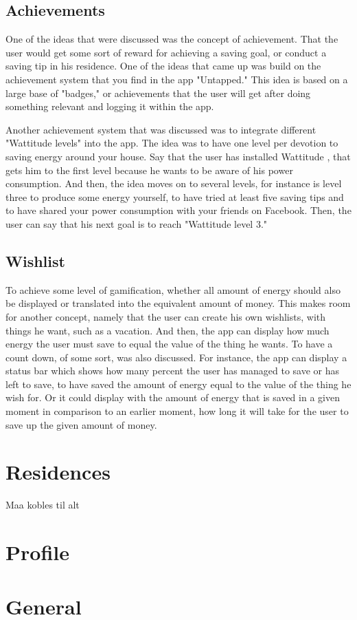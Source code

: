 \subsection{Achievements}
One of the ideas that were discussed was the concept of achievement. That the user would get some sort of reward for achieving a saving goal, or conduct a saving tip in his residence. One of the ideas that came up was build on the achievement system that you find in the app "Untapped." 
This idea is based on a large base of "badges," or achievements that the user will get after doing something relevant and logging it within the app. 

Another achievement system that was discussed was to integrate different "Wattitude levels" into the app. The idea was to have one level per devotion to saving energy around your house. Say that the user has installed Wattitude , that gets him to the first level because he wants to be aware of his power consumption. And then, the idea moves on to several levels, for instance is level three to produce some energy yourself, to have tried at least five saving tips and to have shared your power consumption with your friends on Facebook.  Then, the user can say that his next goal is to reach "Wattitude level 3." 

\subsection{Wishlist}
To achieve some level of gamification, whether all amount of energy should also be displayed or translated into the equivalent amount of money. This makes room for another concept, namely that the user can create his own wishlists, with things he want, such as a vacation. And then, the app can display how much energy the user must save to equal the value of the thing he wants. To have a count down, of some sort, was also discussed. For instance, the app can display a status bar  which shows how many percent the user has managed to save or has left to save, to have saved the amount of energy equal to the value of the thing he wish for. Or it could display with the amount of energy that is saved in a given moment in comparison to an earlier moment, how long it will take for the user to save up the given amount of money.  


\section{Residences}
Maa kobles til alt

\section{Profile}

\section{General}